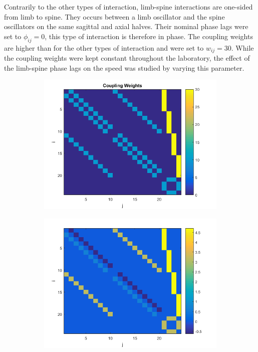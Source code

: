 \documentclass[a4paper]{scrartcl}
\begin{document}
{Contrarily to the other types of interaction, limb-spine interactions are one-sided from limb to spine.  They occurs between a limb oscillator and the spine oscillators on the same sagittal and axial halves. Their nominal phase lags were set to $\phi_{ij} = 0$, this type of interaction is therefore in phase. The coupling weights are higher than for the other types of interaction and were set to $w_{ij} = 30$. While the coupling weights were kept constant throughout the laboratory, the effect of the limb-spine phase lags on the speed was studied by varying this parameter.

\begin{figure}
 \centering
 \begin{subfigure}[b]{\linewidth}
  \centering
  \includegraphics[width=\textwidth]{Figures/weights.png}
  \caption{\label{fig:weights}}
 \end{subfigure}
 \begin{subfigure}[b]{\linewidth}
  \centering
  \includegraphics[width=\textwidth]{Figures/phaselags.png}

\end{subfigure}
\end{figure}}
\end{document}
